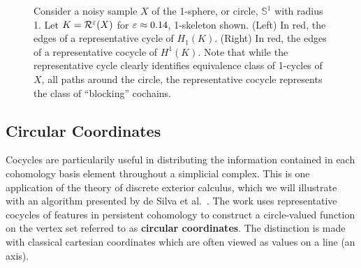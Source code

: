 \begin{figure}[htbp]
    \caption{Consider a noisy sample $X$ of the 1-sphere, or circle, $\mathbb{S}^1$ with radius 1.
            Let $K = \mathcal{R}^\varepsilon(X)$ for $\varepsilon\approx 0.14$, 1-skeleton shown.
            (Left) In red, the edges of a representative cycle of $H_1(K)$.
            (Right) In red, the edges of a representative cocycle of $H^1(K)$.
            Note that while the representative cycle clearly identifies equivalence class of 1-cycles of $X$, all paths around the circle, the representative cocycle represents the class of ``blocking'' cochains.}
    \label{fig:cycles}
\end{figure}

\subsection{Circular Coordinates}

Cocycles are particularily useful in distributing the information contained in each cohomology basis element throughout a simplicial complex.
This is one application of the theory of discrete exterior calculus, which we will illustrate with an algorithm presented by de Silva et al.~\cite{desilva09persistent}.
The work uses representative cocycles of features in persistent cohomology to construct a circle-valued function on the vertex set referred to as \textbf{circular coordinates}.
The distinction is made with classical cartesian coordinates which are often viewed as values on a line (an axis).

